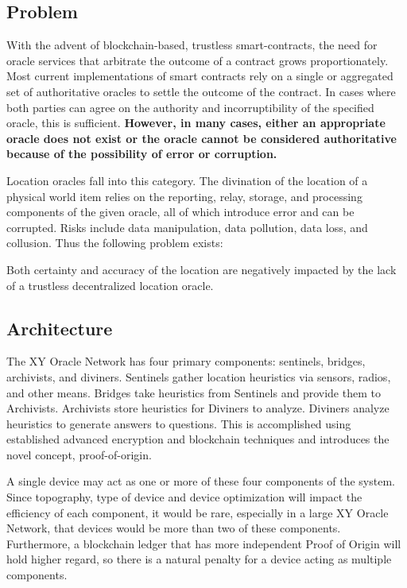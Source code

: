 \documentclass{article}
\begin{document}
\subsection {Problem}
With the advent of blockchain-based, trustless \glspl{smart-contract}, the need for \gls{oracle} services that arbitrate the outcome of a contract grows proportionately. Most current implementations of smart contracts rely on a single or aggregated set of authoritative oracles to settle the outcome of the contract. In cases where both parties can agree on the authority and incorruptibility of the specified oracle, this is sufficient. \textbf{However, in many cases, either an appropriate oracle does not exist or the oracle cannot be considered authoritative because of the possibility of error or corruption.}

Location oracles fall into this category. The divination of the location of a physical world item relies on the reporting, relay, storage, and processing components of the given oracle, all of which introduce error and can be corrupted. Risks include data manipulation, data pollution, data loss, and collusion. Thus the following problem exists:

Both \gls{certainty} and \gls{accuracy} of the location are negatively impacted by the lack of a trustless decentralized location oracle.

\subsection {Architecture}
The XY Oracle Network has four primary components: \Glspl{sentinel}, \Glspl{bridge}, \Glspl{archivist}, and \Glspl{diviner}. Sentinels gather location \glspl{heuristic} via sensors, radios, and other means. Bridges take heuristics from Sentinels and provide them to Archivists. Archivists store heuristics for Diviners to analyze. Diviners analyze heuristics to generate answers to questions. This is accomplished using established advanced encryption and blockchain techniques and introduces the novel concept, \Gls{proof-of-origin}.

A single device may act as one or more of these four components of the system. Since topography, type of device and device optimization will impact the efficiency of each component, it would be rare, especially in a large XY Oracle Network, that devices would be more than two of these components. Furthermore, a blockchain ledger that has more independent Proof of Origin will hold higher regard, so there is a natural penalty for a device acting as multiple components.
\end{document}
